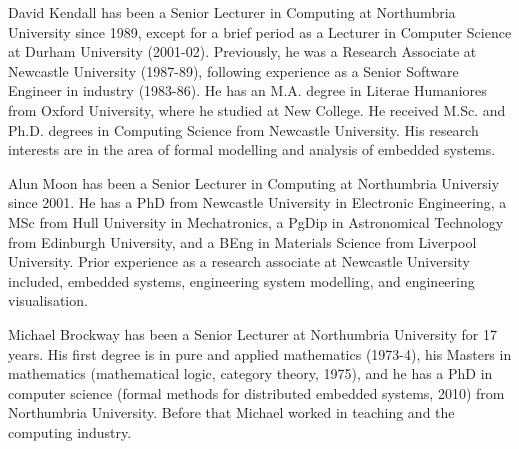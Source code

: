 \documentclass{ieeeaccess}
\begin{document}
	\begin{IEEEbiography}{David Kendall}
	has been a Senior Lecturer in Computing at Northumbria University since 1989, except for a brief period as a Lecturer in Computer Science at Durham University (2001-02). Previously, he was a Research Associate at Newcastle University (1987-89), following experience as a Senior Software Engineer in industry (1983-86). He has an M.A. degree in Literae Humaniores from Oxford University, where he studied at New College. He received M.Sc. and Ph.D. degrees in Computing Science from Newcastle University. His research interests are in the area of formal modelling and analysis of embedded systems. 
	\end{IEEEbiography}
	
	\begin{IEEEbiography}{Alun Moon} has been a Senior Lecturer in Computing at Northumbria Universiy since 2001. He has a PhD from Newcastle University in Electronic Engineering, a MSc from Hull University in Mechatronics, a PgDip in Astronomical Technology from Edinburgh University, and a BEng in Materials Science from Liverpool University.
		Prior experience as a research associate at Newcastle University included, embedded systems, engineering system modelling, and engineering visualisation.
	\end{IEEEbiography}  
		
	\begin{IEEEbiography}{Michael Brockway}
	has been a Senior Lecturer at Northumbria University for 17 years. His first degree is in pure and applied mathematics (1973-4), his Masters in mathematics (mathematical logic, category theory, 1975), and he has a PhD in computer science (formal methods for distributed embedded systems, 2010) from Northumbria University. Before that Michael worked in teaching and the computing industry.
	\end{IEEEbiography}

\EOD
\end{document}
